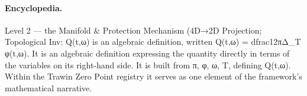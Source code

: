 \paragraph{Encyclopedia.}
Level 2 — the Manifold \& Protection Mechanism (4D→2D Projection; Topological Inv: Q(t,ω) is an algebraic definition, written Q(t,ω) = dfrac12πΔ\_T φ(t,ω). It is an algebraic definition expressing the quantity directly in terms of the variables on its right-hand side. It is built from π, φ, ω, T, defining Q(t,ω). Within the Trawin Zero Point registry it serves as one element of the framework's mathematical narrative.
